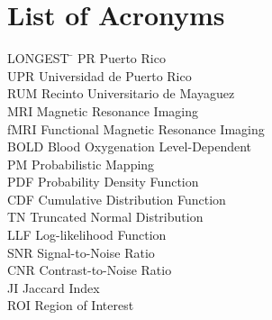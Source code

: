 

\chapter*{List of Acronyms}




 \noindent
\vspace{-1.75\baselineskip}
  \begin{tabbing}
LONGEST \=  \kill 
PR \> Puerto Rico\\
UPR \> Universidad de Puerto Rico\\ %
RUM \> Recinto Universitario de Mayaguez\\
MRI \> Magnetic Resonance Imaging\\
fMRI \> Functional Magnetic Resonance Imaging\\
BOLD \> Blood Oxygenation Level-Dependent \\
PM \> Probabilistic Mapping \\
PDF \> Probability Density Function \\
CDF \> Cumulative Distribution Function \\
TN \> Truncated Normal Distribution \\
LLF \> Log-likelihood Function \\
SNR \> Signal-to-Noise Ratio \\
CNR \> Contrast-to-Noise Ratio \\
JI \> Jaccard Index \\
ROI \> Region of Interest

\end{tabbing}